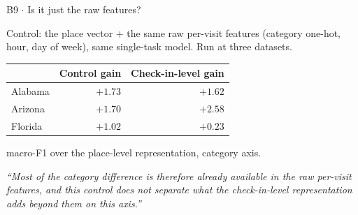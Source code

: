 \documentclass{beamer}
\begin{document}
\begin{frame}{B9 $\cdot$ Is it just the raw features?}
    \vspace{0pt}%
    {\small Control: the place vector $+$ the same raw per-visit features (category one-hot, hour,
    day of week), same single-task model. Run at three datasets.\par}
    \begin{center}
    \small
    \setlength{\tabcolsep}{9pt}
    \begin{tabular}{@{}lrr@{}}
        \toprule
        & \textbf{Control gain} & \textbf{Check-in-level gain} \\
        \midrule
        Alabama & \textbf{$+1.73$} & $+1.62$ \\
        Arizona & $+1.70$ & \textbf{$+2.58$} \\
        Florida & \textbf{$+1.02$} & $+0.23$ \\
        \bottomrule
    \end{tabular}\par
    \smallskip
    {\footnotesize macro-F1 over the place-level representation, category axis.\par}
    \end{center}
    \begin{block}{}
        \small
        \emph{``Most of the category difference is therefore already available in the raw per-visit
        features, and this control does not separate what the check-in-level representation adds
        beyond them on this axis.''}
    \end{block}
\end{frame}
\end{document}
